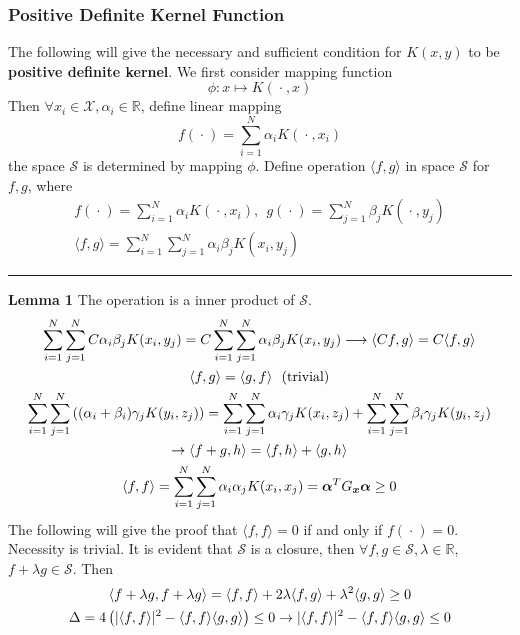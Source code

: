 \documentclass[12pt]{article}
\newcommand{\bdot}{~\bm{\cdot}~}
\newcommand{\la}{\langle}
\newcommand{\ra}{\rangle}
\begin{document}
\subsubsection{Positive Definite Kernel Function}
The following will give the necessary and sufficient condition for $K(x, y)$ to be \textbf{positive definite kernel}. We first consider mapping function
\begin{equation}
    \phi: x \mapsto K(\bdot, x)
\end{equation}
Then $\forall x_i \in \mathcal{X},\alpha_i \in \mathbb{R}$, define linear mapping
\begin{equation}
    f(\bdot) = \sum_{i=1}^N \alpha_i K(\bdot, x_i)
\end{equation} 
the space $\mathcal{S}$ is determined by mapping $\phi$. Define operation $\langle f, g \rangle$ in space $\mathcal{S}$ for $f, g$, where
\begin{gather}
    f(\bdot) = \sum_{i=1}^N \alpha_i K(\bdot, x_i),~~
    g(\bdot) = \sum_{j=1}^N \beta_j K(\bdot, y_j) \\
    \langle f, g \rangle = \sum_{i=1}^N\sum_{j=1}^N \alpha_i \beta_j K(x_i, y_j)
\end{gather}
\rule[-5pt]{\linewidth}{0.07em}
\noindent \textbf{Lemma 1} The operation is a inner product of $\mathcal{S}$.
\begin{gather}
    \sum_{i=1}^N\sum_{j=1}^N C\alpha_i \beta_j K(x_i, y_j) = C\sum_{i=1}^N\sum_{j=1}^N \alpha_i \beta_j K(x_i, y_j) \longrightarrow \la Cf, g \ra = C\la f, g \ra \\
    \la f, g \ra = \la g, f \ra~~(\text{trivial}) \\
    \sum_{i=1}^N\sum_{j=1}^N \left( (\alpha_i + \beta_i) \gamma_j K(y_i, z_j) \right) = \sum_{i=1}^N\sum_{j=1}^N  \alpha_i \gamma_j K(x_i, z_j) + \sum_{i=1}^N \sum_{j=1}^N \beta_i \gamma_j K(y_i, z_j) \notag\\ \rightarrow \la f+g, h \ra = \la f, h \ra + \la g, h \ra \\
    \la f, f \ra = \sum_{i=1}^N \sum_{j=1}^N \alpha_i \alpha_j K(x_i, x_j) = \bm{\alpha}^TG_{\bm{x}}\bm{\alpha} \geq 0 
\end{gather}
The following will give the proof that $\la f, f \ra = 0$ if and only if $f(\bdot) = 0$. Necessity is trivial. It is evident that $\mathcal{S}$ is a closure, then $\forall f, g \in \mathcal{S}, \lambda \in \mathbb{R}$, $f + \lambda g \in \mathcal{S}$. Then
\begin{gather}
    \la f + \lambda g, f + \lambda g \ra = \la f, f \ra + 2\lambda \la f, g \ra + \lambda^2 \la g, g \ra \geq 0 \notag \\
    \Delta = 4\left(|\la f, f \ra |^2 - \la f, f \ra \la g, g \ra \right) \leq 0 \rightarrow |\la f, f \ra |^2 - \la f, f \ra \la g, g \ra \leq 0
\end{gather}
\end{document}
